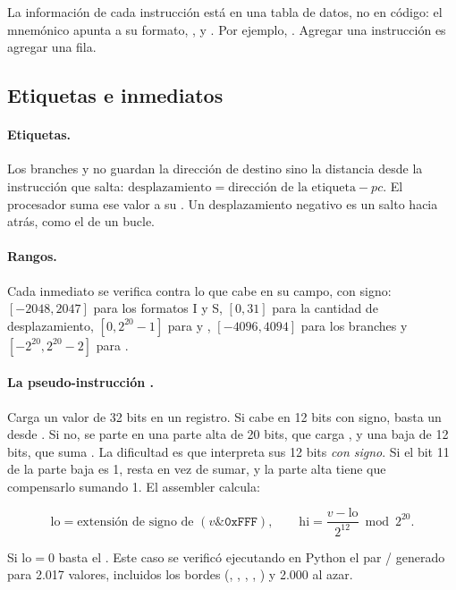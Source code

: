 La información de cada instrucción está en una tabla de datos, no en código: el
mnemónico apunta a su formato, ,  y . Por ejemplo,
. Agregar una instrucción es agregar una fila.

\subsection{Etiquetas e inmediatos}

\paragraph{Etiquetas.} Los branches y  no guardan la dirección de destino
sino la distancia desde la instrucción que salta: $\text{desplazamiento} =
\text{dirección de la etiqueta} - pc$. El procesador suma ese valor a su . Un
desplazamiento negativo es un salto hacia atrás, como el de un bucle.

\paragraph{Rangos.} Cada inmediato se verifica contra lo que cabe en su campo, con
signo: $[-2048, 2047]$ para los formatos I y S, $[0, 31]$ para la cantidad de
desplazamiento, $[0, 2^{20}-1]$ para  y , $[-4096, 4094]$ para
los branches y $[-2^{20}, 2^{20}-2]$ para .

\paragraph{La pseudo-instrucción .}
\label{sec:li}
Carga un valor de 32 bits en un registro. Si cabe en 12 bits con signo, basta un
 desde . Si no, se parte en una parte alta de 20 bits, que carga
, y una baja de 12 bits, que suma . La dificultad es que
 interpreta sus 12 bits \emph{con signo}. Si el bit 11 de la parte baja
es 1,  resta en vez de sumar, y la parte alta tiene que compensarlo sumando 1.
El assembler calcula:

\[
  \text{lo} = \text{extensión de signo de } (v \mathbin{\&} \texttt{0xFFF}), \qquad
  \text{hi} = \frac{v - \text{lo}}{2^{12}} \bmod 2^{20}.
\]

Si $\text{lo} = 0$ basta el . Este caso se verificó ejecutando en Python el
par / generado para 2.017 valores, incluidos los bordes
(, , , , ) y
2.000 al azar.

